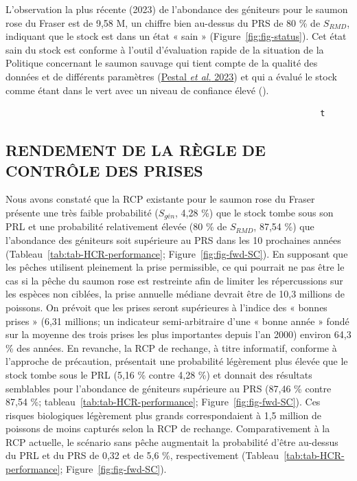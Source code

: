 \documentclass[french,11pt]{book}
\begin{document}
L'observation la plus récente (2023) de l'abondance des géniteurs pour le saumon rose du Fraser est de 9,58 M, un chiffre bien au-dessus du PRS de 80 \% de \(S_{RMD}\), indiquant que le stock est dans un état « sain » (Figure~\ref{fig:fig-status}). Cet état sain du stock est conforme à l'outil d'évaluation rapide de la situation de la Politique concernant le saumon sauvage qui tient compte de la qualité des données et de différents paramètres (\protect\hyperlink{ref-pestalStateSalmonRapid2023}{Pestal \emph{et al.} 2023}) et qui a évalué le stock comme étant dans le vert avec un niveau de confiance élevé ().
\begin{verbatim}
                                                                t   
\end{verbatim}
\hypertarget{rendement-de-la-ruxe8gle-de-contruxf4le-des-prises}{%
\subsection{RENDEMENT DE LA RÈGLE DE CONTRÔLE DES PRISES}\label{rendement-de-la-ruxe8gle-de-contruxf4le-des-prises}}

Nous avons constaté que la RCP existante pour le saumon rose du Fraser présente une très faible probabilité (\(S_{gén}\), 4,28 \%) que le stock tombe sous son PRL et une probabilité relativement élevée (80 \% de \(S_{RMD}\), 87,54 \%) que l'abondance des géniteurs soit supérieure au PRS dans les 10 prochaines années (Tableau~\ref{tab:tab-HCR-performance}; Figure~\ref{fig:fig-fwd-SC}). En supposant que les pêches utilisent pleinement la prise permissible, ce qui pourrait ne pas être le cas si la pêche du saumon rose est restreinte afin de limiter les répercussions sur les espèces non ciblées, la prise annuelle médiane devrait être de 10,3 millions de poissons. On prévoit que les prises seront supérieures à l'indice des « bonnes prises » (6,31 millions; un indicateur semi-arbitraire d'une « bonne année » fondé sur la moyenne des trois prises les plus importantes depuis l'an 2000) environ 64,3 \% des années. En revanche, la RCP de rechange, à titre informatif, conforme à l'approche de précaution, présentait une probabilité légèrement plus élevée que le stock tombe sous le PRL (5,16 \% contre 4,28 \%) et donnait des résultats semblables pour l'abondance de géniteurs supérieure au PRS (87,46 \% contre 87,54 \%; tableau~\ref{tab:tab-HCR-performance}; Figure~\ref{fig:fig-fwd-SC}). Ces risques biologiques légèrement plus grands correspondaient à 1,5 million de poissons de moins capturés selon la RCP de rechange. Comparativement à la RCP actuelle, le scénario sans pêche augmentait la probabilité d'être au-dessus du PRL et du PRS de 0,32 et de 5,6 \%, respectivement (Tableau~\ref{tab:tab-HCR-performance}; Figure~\ref{fig:fig-fwd-SC}).
\end{document}
